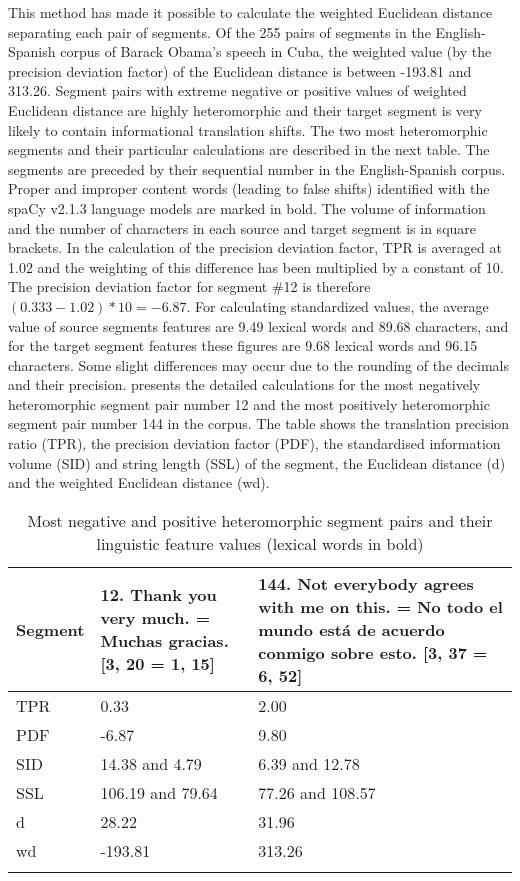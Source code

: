 \documentclass[output=paper]{langsci/langscibook}
\begin{document}
This method has made it possible to calculate the weighted Euclidean distance separating each pair of segments. Of the 255 pairs of segments in the English-Spanish corpus of Barack Obama's speech in Cuba, the weighted value (by the precision deviation factor) of the Euclidean distance is between -193.81 and 313.26. Segment pairs with extreme negative or positive values of weighted Euclidean distance are highly heteromorphic and their target segment is very likely to contain informational translation shifts. The two most heteromorphic segments and their particular calculations are described in the next table. The segments are preceded by their sequential number in the English-Spanish corpus. Proper and improper content words (leading to false shifts) identified with the spaCy v2.1.3 language models are marked in bold. The volume of information and the number of characters in each source and target segment is in square brackets. In the calculation of the precision deviation factor, TPR is averaged at 1.02 and the weighting of this difference has been multiplied by a constant of 10. The precision deviation factor for segment \#12 is therefore $(0.333-1.02)*10=-6.87$. For calculating standardized values, the average value of source segments features are 9.49 lexical words and 89.68 characters, and for the target segment features these figures are 9.68 lexical words and 96.15 characters. Some slight differences may occur due to the rounding of the decimals and their precision.  presents the detailed calculations for the most negatively heteromorphic segment pair number 12 and the most positively heteromorphic segment pair number 144 in the corpus. The table shows the translation precision ratio (TPR), the precision deviation factor (PDF), the standardised information volume (SID) and string length (SSL) of the segment, the Euclidean distance (d) and the weighted Euclidean distance (wd).

\begin{table}\caption{Most negative and positive heteromorphic segment pairs and their linguistic feature values (lexical words in bold)}\label{ep:het}
  \begin{tabularx}{\textwidth}{lQX}
    \lsptoprule
    Segment & 12. \textbf{Thank} you \textbf{very much}. = Muchas \textbf{gracias}. [3, 20 = 1, 15] & 144. \textbf{Not everybody agrees} with me on this. = \textbf{No} todo el \textbf{mundo está} de \textbf{acuerdo conmigo} 
    \textbf{sobre} esto. [3, 37 = 6, 52]\\
    \midrule
    TPR & 0.33 & 2.00\\
    PDF & -6.87 & 9.80\\
    SID & 14.38 and 4.79 & 6.39 and 12.78\\
    SSL & 106.19 and 79.64 & 77.26 and 108.57\\
    d & 28.22 & 31.96\\
    wd & -193.81 & 313.26\\
    \lspbottomrule
  \end{tabularx}
\end{table}
\end{document}
